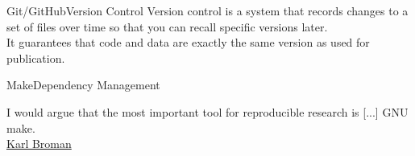 \documentclass[12pt,t]{beamer}
\begin{document}
{{
  \begin{frame}[plain]
  \end{frame}
}
{
  \begin{frame}[plain]
  \end{frame}
}
\begin{frame}[c]{Git/GitHub\textemdash{}Version Control}
  Version control is a system that records changes to a set of files
  over time so that you can recall specific versions later.\\
  \vspace{10mm}
  It guarantees that code and data are exactly the same version as used for
  publication.
\end{frame}
\begin{frame}[c]{Make\textemdash{}Dependency Management}

I would argue that the most important tool for reproducible research is [...] GNU make.\\
\hfill {\textendash} \href{https://kbroman.org/minimal_make/}{Karl Broman}\\


\end{frame}}
\end{document}
